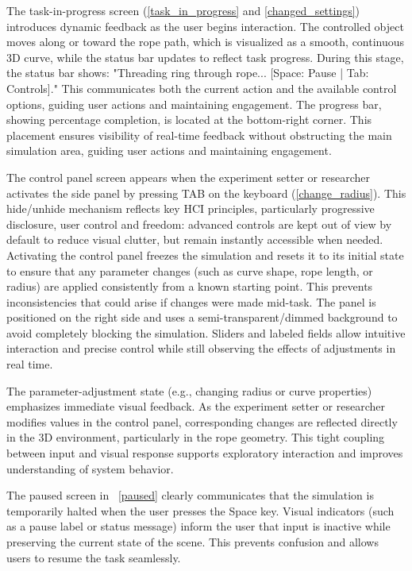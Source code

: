 \documentclass[sigconf]{acmart}
\begin{document}
The task-in-progress screen (\autoref{task_in_progress} and \autoref{changed_settings}) introduces dynamic feedback as the user begins interaction. The controlled object moves along or toward the rope path, which is visualized as a smooth, continuous 3D curve, while the status bar updates to reflect task progress. During this stage, the status bar shows: "Threading ring through rope... [Space: Pause | Tab: Controls]." This communicates both the current action and the available control options, guiding user actions and maintaining engagement. The progress bar, showing percentage completion, is located at the bottom-right corner. This placement ensures visibility of real-time feedback without obstructing the main simulation area, guiding user actions and maintaining engagement.

The control panel screen appears when the experiment setter or researcher activates the side panel by pressing TAB on the keyboard (\autoref{change_radius}). This hide/unhide mechanism reflects key HCI principles, particularly progressive disclosure, user control and freedom: advanced controls are kept out of view by default to reduce visual clutter, but remain instantly accessible when needed. Activating the control panel freezes the simulation and resets it to its initial state to ensure that any parameter changes (such as curve shape, rope length, or radius) are applied consistently from a known starting point. This prevents inconsistencies that could arise if changes were made mid-task. The panel is positioned on the right side and uses a semi-transparent/dimmed background to avoid completely blocking the simulation. Sliders and labeled fields allow intuitive interaction and precise control while still observing the effects of adjustments in real time.

The parameter-adjustment state (e.g., changing radius or curve properties) emphasizes immediate visual feedback. As the experiment setter or researcher modifies values in the control panel, corresponding changes are reflected directly in the 3D environment, particularly in the rope geometry. This tight coupling between input and visual response supports exploratory interaction and improves understanding of system behavior.

The paused screen in ~\autoref{paused} clearly communicates that the simulation is temporarily halted when the user presses the Space key. Visual indicators (such as a pause label or status message) inform the user that input is inactive while preserving the current state of the scene. This prevents confusion and allows users to resume the task seamlessly.
\end{document}
